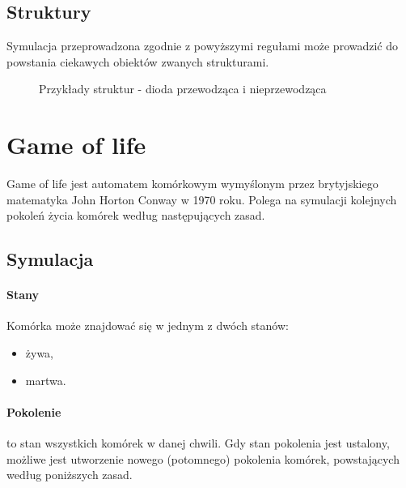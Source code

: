 \documentclass{report}
\begin{document}
\subsection{Struktury}
Symulacja przeprowadzona zgodnie z powyższymi regułami może prowadzić do powstania ciekawych obiektów zwanych strukturami. 
\begin{figure}[h]
\centering
\setlength{\fboxsep}{0pt} %
\setlength{\fboxrule}{1pt} %
\caption{Przykłady struktur - dioda przewodząca i nieprzewodząca}
\end{figure}


\section{Game of life}

Game of life jest automatem komórkowym wymyślonym przez brytyjskiego matematyka John Horton Conway
w 1970 roku. Polega na symulacji kolejnych pokoleń życia komórek według następujących zasad.

\subsection{Symulacja}

\paragraph{Stany}  Komórka może znajdować się w jednym z dwóch stanów:
\begin{itemize}
\item żywa,
\item martwa.
\end{itemize}

\paragraph{Pokolenie} to stan wszystkich komórek w danej chwili. Gdy stan pokolenia jest ustalony, możliwe jest utworzenie nowego (potomnego) pokolenia komórek, powstających według poniższych zasad.
\end{document}

